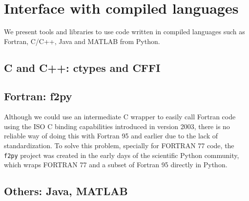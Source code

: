 \section{Interface with compiled languages}
\label{sec:interface}

We present tools and libraries to use code written in compiled languages such as Fortran, C/C++, Java and MATLAB from Python.

\subsection{C and C++: ctypes and CFFI}

\subsection{Fortran: f2py}

Although we could use an intermediate C wrapper to easily call Fortran code using the ISO C binding capabilities introduced in version 2003, there is no reliable way of doing this with Fortran 95 and earlier due to the lack of standardization. To solve this problem, specially for FORTRAN 77 code, the \verb|f2py| project was created in the early days of the scientific Python community, which wraps FORTRAN 77 and a subset of Fortran 95 directly in Python\cite{peterson2009f2py}.

\subsection{Others: Java, MATLAB}